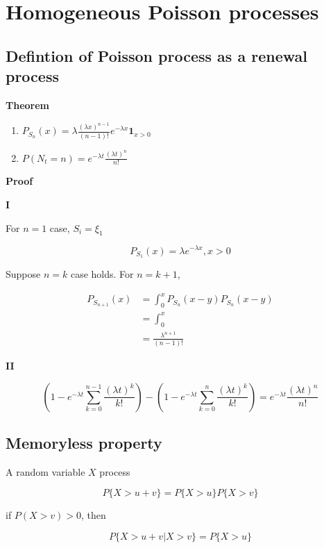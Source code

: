 \documentclass[12pt]{article}
\theoremstyle{nonumberbreak}
\begin{document}
\section{Homogeneous Poisson processes}


\subsection{Defintion of Poisson process as a renewal process}


\begin{theorem}
\textbf{Theorem}
\begin{enumerate}[label=(\roman*)]
	\item $P_{S_n} (x) = \lambda \frac{(\lambda x)^{n-1}}{(n-1)!} e^{-\lambda x} \mathbf{1}_{x>0}$
	\item $P(N_t = n) = e^{-\lambda t} \frac{(\lambda t)^n}{n!}$
\end{enumerate}
\end{theorem}

\textbf{Proof} 

\textbf{I}

For $n=1$ case, $S_i = \xi_1$

$$
P_{S_1} (x) = \lambda e^{-\lambda x}, x>0
$$

Suppose $n=k$ case holds. For $n=k+1$, 

$$
\begin{aligned}
P_{S_{n+1}}(x) &= \int_0^x P_{S_n} ( x-y)  P_{S_n} ( x-y) \\[8pt]
&= \int_0^x \frac{}{} \\[8pt]
&= \frac{\lambda^{n+1}}{(n-1)!} 
\end{aligned}
$$




\textbf{II}

$$
(1 - e^{-\lambda t} \sum_{k=0}^{n-1} \frac{(\lambda t)^k}{k!}) - (1 - e^{-\lambda t} \sum_{k=0}^n \frac{(\lambda t)^k}{k!}) = e^{-\lambda t} \frac{(\lambda t)^n}{n!}
$$



\subsection{Memoryless property}


A random variable $X$ process 

$$
P \{ X > u + v \} = P \{ X > u  \} P \{ X > v \}
$$

if $P (X > v) > 0$, then

$$
P \{ X > u + v  | X > v\} = P\{ X > u\}
$$
\end{document}
